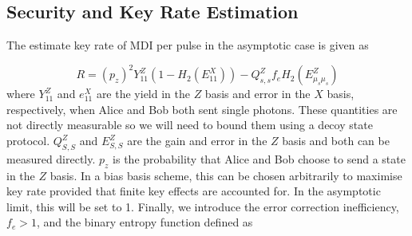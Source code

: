 %
%
%
%
%
%
%
%
%
%
%
%


\subsection{Security and Key Rate Estimation}

The estimate key rate of \ac{MDI} per pulse in the asymptotic case is given as

\begin{equation}
	R = (p_z)^2 Y_{11}^Z \left(1 - H_2(E_{11}^X)\right) - Q_{s,s}^Z f_e H_2(E_{\mu_s\mu_s}^Z)
\end{equation}
where $Y_{11}^Z$ and $e_{11}^X$ are the yield in the $Z$ basis and error in the $X$ basis, respectively, when Alice and Bob both sent single photons. These quantities are not directly measurable so we will need to bound them using a decoy state protocol. $Q_{S,S}^Z$ and $E_{S,S}^Z$ are the gain and error in the $Z$ basis and both can be measured directly. $p_z$  is the probability that Alice and Bob choose to send a state in the $Z$ basis. In a bias basis scheme, this can be chosen arbitrarily to maximise key rate provided that finite key effects are accounted for. In the asymptotic limit, this will be set to 1. Finally, we introduce the error correction inefficiency, $f_e>1$, and the binary entropy function defined as

